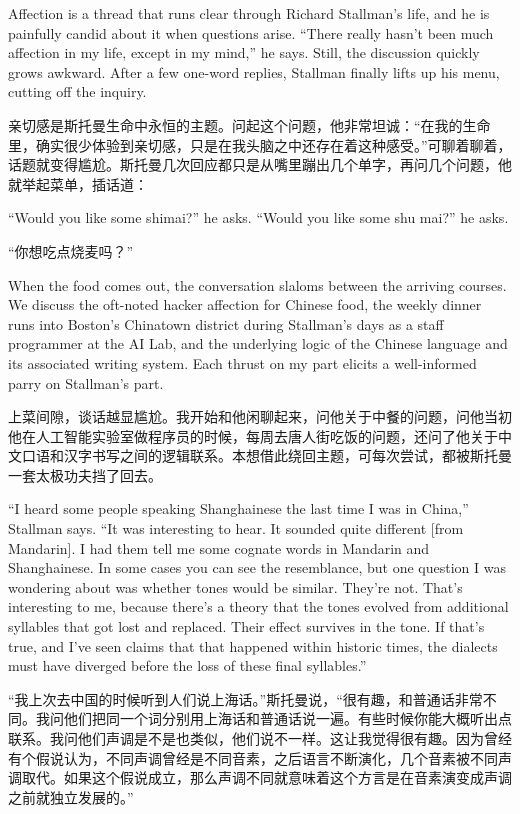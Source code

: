 \ifdefined\eng
Affection is a thread that runs clear through Richard Stallman's life, and he is painfully candid about it when questions arise. ``There really hasn't been much affection in my life, except in my mind,'' he says. Still, the discussion quickly grows awkward. After a few one-word replies, Stallman finally lifts up his menu, cutting off the inquiry.
\fi

\ifdefined\chs
亲切感是斯托曼生命中永恒的主题。问起这个问题，他非常坦诚：``在我的生命里，确实很少体验到亲切感，只是在我头脑之中还存在着这种感受。''可聊着聊着，话题就变得尴尬。斯托曼几次回应都只是从嘴里蹦出几个单字，再问几个问题，他就举起菜单，插话道：
\fi

\ifdefined\eng
\ifdefined\vone
``Would you like some shimai?'' he asks.
\fi
\ifdefined\vtwo
``Would you like some shu mai?'' he asks.
\fi
\fi

\ifdefined\chs
``你想吃点烧麦吗？''
\fi

\ifdefined\eng
When the food comes out, the conversation slaloms between the arriving courses. We discuss the oft-noted hacker affection for Chinese food, the weekly dinner runs into Boston's Chinatown district during Stallman's days as a staff programmer at the AI Lab, and the underlying logic of the Chinese language and its associated writing system. Each thrust on my part elicits a well-informed parry on Stallman's part.
\fi

\ifdefined\chs
上菜间隙，谈话越显尴尬。我开始和他闲聊起来，问他关于中餐的问题，问他当初他在人工智能实验室做程序员的时候，每周去唐人街吃饭的问题，还问了他关于中文口语和汉字书写之间的逻辑联系。本想借此绕回主题，可每次尝试，都被斯托曼一套太极功夫挡了回去。
\fi

\ifdefined\eng
``I heard some people speaking Shanghainese the last time I was in China,'' Stallman says. ``It was interesting to hear. It sounded quite different [from Mandarin]. I had them tell me some cognate words in Mandarin and Shanghainese. In some cases you can see the resemblance, but one question I was wondering about was whether tones would be similar. They're not. That's interesting to me, because there's a theory that the tones evolved from additional syllables that got lost and replaced. Their effect survives in the tone. If that's true, and I've seen claims that that happened within historic times, the dialects must have diverged before the loss of these final syllables.''
\fi

\ifdefined\chs
``我上次去中国的时候听到人们说上海话。''斯托曼说，``很有趣，和普通话非常不同。我问他们把同一个词分别用上海话和普通话说一遍。有些时候你能大概听出点联系。我问他们声调是不是也类似，他们说不一样。这让我觉得很有趣。因为曾经有个假说认为，不同声调曾经是不同音素，之后语言不断演化，几个音素被不同声调取代。如果这个假说成立，那么声调不同就意味着这个方言是在音素演变成声调之前就独立发展的。''
\fi

